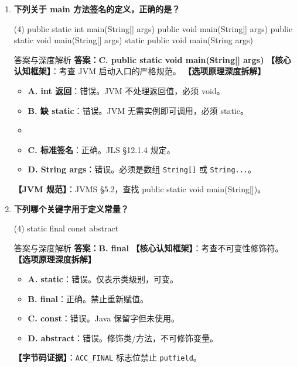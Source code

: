 ﻿\documentclass[12pt, a4paper]{ctexart}
\newcommand{\code}[1]{\texttt{#1}}
\begin{document}
\begin{enumerate}[label=\textbf{\arabic*.}, itemsep=1em]
	\item \textbf{下列关于 main 方法签名的定义，正确的是？}
	      \begin{tasks}(4)
		      \task public static int main(String[] args)
		      \task public void main(String[] args)
		      \task public static void main(String[] args)
		      \task static public void main(String args)
	      \end{tasks}
	      \begin{bluebox}{答案与深度解析}
		      \textbf{答案：C. public static void main(String[] args)}
		      \textbf{【核心认知框架】}：考查 JVM 启动入口的严格规范。
		      \textbf{【选项原理深度拆解】}
		      \begin{itemize}[leftmargin=*, nosep]
			      \item \textbf{A. int 返回}：错误。JVM 不处理返回值，必须 void。
			      \item \textbf{B. 缺 static}：错误。JVM 无需实例即可调用，必须 static。
			      \item \item \textbf{C. 标准签名}：正确。JLS §12.1.4 规定。
			      \item \textbf{D. String args}：错误。必须是数组 \code{String[]} 或 \code{String...}。
		      \end{itemize}
		      \textbf{【JVM 规范】}：JVMS §5.2，查找 public static void main(String[])。
	      \end{bluebox}

	\item \textbf{下列哪个关键字用于定义常量？}
	      \begin{tasks}(4)
		      \task static \task final \task const \task abstract
	      \end{tasks}
	      \begin{bluebox}{答案与深度解析}
		      \textbf{答案：B. final}
		      \textbf{【核心认知框架】}：考查不可变性修饰符。
		      \textbf{【选项原理深度拆解】}
		      \begin{itemize}[leftmargin=*, nosep]
			      \item \textbf{A. static}：错误。仅表示类级别，可变。
			      \item \textbf{B. final}：正确。禁止重新赋值。
			      \item \textbf{C. const}：错误。Java 保留字但未使用。
			      \item \textbf{D. abstract}：错误。修饰类/方法，不可修饰变量。
		      \end{itemize}
		      \textbf{【字节码证据】}：\code{ACC\_FINAL} 标志位禁止 \code{putfield}。
	      \end{bluebox}


\end{enumerate}
\end{document}
